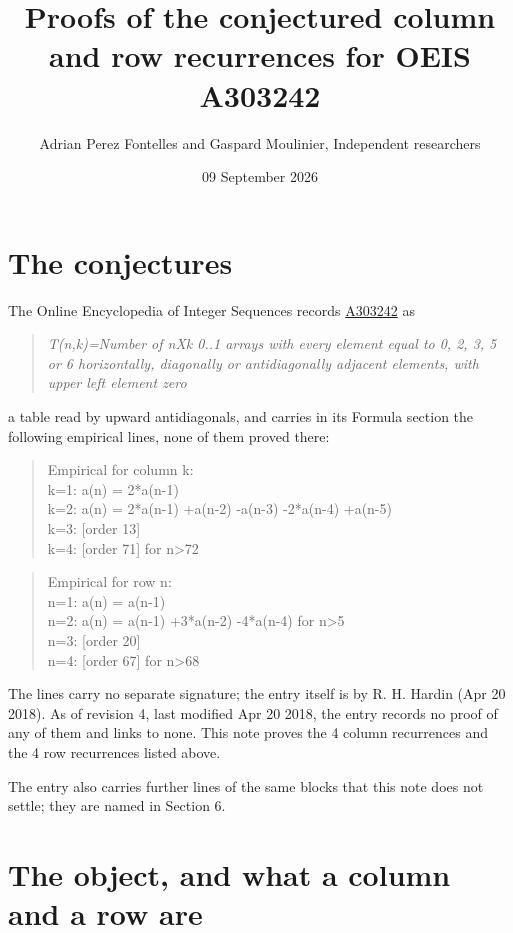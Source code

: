 \documentclass[11pt]{article}
\title{Proofs of the conjectured column and row recurrences for OEIS A303242}
\author{Adrian Perez Fontelles and Gaspard Moulinier, Independent researchers}
\date{09 September 2026}
\theoremstyle{definition}
\begin{document}
\maketitle
\section{The conjectures}

The Online Encyclopedia of Integer Sequences records \href{https://oeis.org/A303242}{A303242} as

\begin{quote}\itshape T(n,k)=Number of nXk 0..1 arrays with every element equal to 0, 2, 3, 5 or 6 horizontally, diagonally or antidiagonally adjacent elements, with upper left element zero\end{quote}

a table read by upward antidiagonals, and carries in its Formula section the following empirical lines, none of them proved there:

\begin{quote}\ttfamily Empirical for column k:\\
k=1: a(n) = 2*a(n-1)\\k=2: a(n) = 2*a(n-1) +a(n-2) -a(n-3) -2*a(n-4) +a(n-5)\\k=3: [order 13]\\k=4: [order 71] for n>72\end{quote}

\begin{quote}\ttfamily Empirical for row n:\\
n=1: a(n) = a(n-1)\\n=2: a(n) = a(n-1) +3*a(n-2) -4*a(n-4) for n>5\\n=3: [order 20]\\n=4: [order 67] for n>68\end{quote}

The lines carry no separate signature; the entry itself is by R. H. Hardin (Apr 20 2018). As of revision 4, last modified Apr 20 2018, the entry records no proof of any of them and links to none. This note proves the 4 column recurrences and the 4 row recurrences listed above.

The entry also carries further lines of the same blocks that this note does not settle; they are named in Section 6.

\section{The object, and what a column and a row are}
\end{document}
